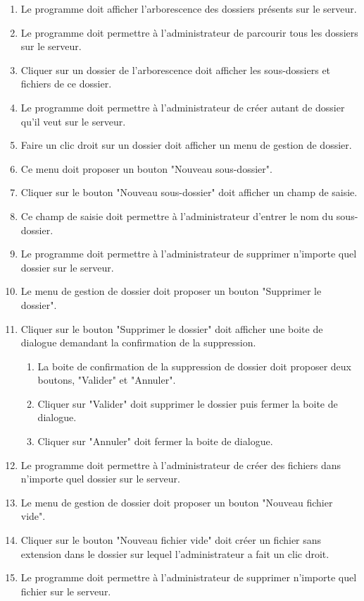 \documentclass[10pt,a4paper]{report}
\begin{document}
	\begin{enumerate}
		\item Le programme doit afficher l'arborescence des dossiers présents sur le serveur.
		\item Le programme doit permettre à l'administrateur de parcourir tous les dossiers sur le serveur.
		\item Cliquer sur un dossier de l'arborescence doit afficher les sous-dossiers et fichiers de ce dossier.
		\item Le programme doit permettre à l'administrateur de créer autant de dossier qu'il veut sur le serveur.
		\item Faire un clic droit sur un dossier doit afficher un menu de gestion de dossier.
		\item Ce menu doit proposer un bouton "Nouveau sous-dossier".
		\item Cliquer sur le bouton "Nouveau sous-dossier" doit afficher un champ de saisie.
		\item Ce champ de saisie doit permettre à l'administrateur d'entrer le nom du sous-dossier.
		\item Le programme doit permettre à l'administrateur de supprimer n'importe quel dossier sur le serveur.
		\item Le menu de gestion de dossier doit proposer un bouton "Supprimer le dossier".
		\item Cliquer sur le bouton "Supprimer le dossier" doit afficher une boite de dialogue demandant la confirmation de la suppression.
		\begin{enumerate}[label=\arabic*.]
			\item La boite de confirmation de la suppression de dossier doit proposer deux boutons, "Valider" et "Annuler".
			\item Cliquer sur "Valider" doit supprimer le dossier puis fermer la boite de dialogue.
			\item Cliquer sur "Annuler" doit fermer la boite de dialogue.
		\end{enumerate}
		\item Le programme doit permettre à l'administrateur de créer des fichiers dans n'importe quel dossier sur le serveur.
		\item Le menu de gestion de dossier doit proposer un bouton "Nouveau fichier vide".
		\item Cliquer sur le bouton "Nouveau fichier vide" doit créer un fichier sans extension dans le dossier sur lequel l'administrateur a fait un clic droit.
		\item Le programme doit permettre à l'administrateur de supprimer n'importe quel fichier sur le serveur.

\end{enumerate}
\end{document}
